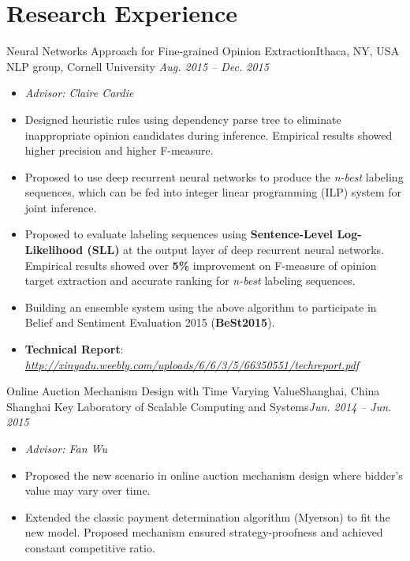 \documentclass[letterpaper,12pt]{resume}
\begin{document}
\section{Research Experience}
\begin{itemize}
 
   \credential
     {Neural Networks Approach for Fine-grained Opinion Extraction}{Ithaca, NY, USA}
    {NLP group, Cornell University}
    {\textit{Aug. 2015 -- Dec. 2015}}
    {
    \begin{itemize}
     \item{ \textit{Advisor: Claire Cardie}}
    
    \item{Designed heuristic rules using dependency parse tree to eliminate inappropriate opinion candidates during inference. Empirical results showed higher precision and higher F-measure.}
    
    \item{Proposed to use deep recurrent neural networks to produce the \textit{n-best} labeling sequences, which can be fed into integer linear programming (ILP) system for joint inference.}
    
	 \item{Proposed to evaluate labeling sequences using \textbf{Sentence-Level Log-Likelihood (SLL)} at the output layer of deep recurrent neural networks. Empirical results showed over \textbf{5\%} improvement on F-measure of opinion target extraction and accurate  ranking for \textit{n-best} labeling sequences. }%
	 
	 \item{ Building an ensemble system using the above algorithm to participate in Belief and Sentiment Evaluation 2015 (\textbf{BeSt2015}).}
	 
	   \item{ \textbf{Technical Report}: \textit{\footnotesize \url{http://xinyadu.weebly.com/uploads/6/6/3/5/66350551/techreport.pdf}}}%
	
    \end{itemize}
    }
    
      \credential
    {Online Auction Mechanism Design with Time Varying Value}{Shanghai, China}
    {Shanghai Key Laboratory of Scalable Computing and Systems}{\textit{Jun. 2014 -- Jun. 2015}}
    {
    \begin{itemize}
    \item{ \textit{Advisor: Fan Wu}}
     \item{ Proposed the new scenario in online auction mechanism design where bidder's value may vary over time.}
      \item{
	Extended the classic payment determination algorithm (Myerson) to fit the new model. Proposed mechanism ensured strategy-proofness and achieved constant competitive ratio. 
        }
  

\end{itemize}}
\end{itemize}
\end{document}
